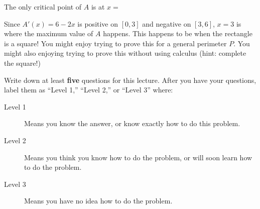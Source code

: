 \documentclass{ximera}
\begin{document}
\begin{question}
	\begin{solution}
	The only critical point of $A$ is at $x=$
	\end{solution}
	
	Since $A'(x) = 6-2x$ is positive on $[0,3]$ and negative on $[3,6]$, $x=3$ is where the maximum value of $A$ happens.
	This happens to be when the rectangle is a square!  You might enjoy trying to prove this for a general perimeter $P$.  You might also enjoying trying to prove this without using calculus (hint:  complete the square!)
\end{question}



Write down at least \textbf{five} questions for this lecture. After
you have your questions, label them as ``Level 1,'' ``Level 2,'' or ``Level 3'' where:
\begin{description}
\item[Level 1] Means you know the answer, or know exactly how to do this problem.
\item[Level 2] Means you think you know how to do the problem, or will soon learn how to do the problem.
\item[Level 3] Means you have no idea how to do the problem. 
\end{description}
\begin{question}
  \begin{freeResponse}
  \end{freeResponse}
\end{question}
\end{document}
